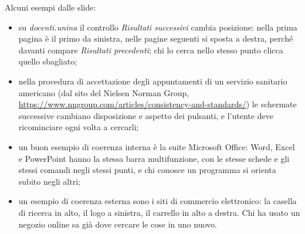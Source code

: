 Alcuni esempi dalle slide:

\begin{itemize}
  \item su \textit{docenti.unina} il controllo \textit{Risultati successivi} cambia posizione: nella prima pagina è il
        primo da sinistra, nelle pagine seguenti si sposta a destra, perché davanti compare \textit{Risultati
        precedenti}; chi lo cerca nello stesso punto clicca quello sbagliato;
\end{itemize}

\begin{center}
\end{center}

\begin{itemize}
  \item nella procedura di accettazione degli appuntamenti di un servizio sanitario americano (dal sito del Nielsen
        Norman Group, \url{https://www.nngroup.com/articles/consistency-and-standards/}) le schermate successive
        cambiano disposizione e aspetto dei pulsanti, e l'utente deve ricominciare ogni volta a cercarli;
  \item un buon esempio di coerenza interna è la suite Microsoft Office: Word, Excel e PowerPoint hanno la stessa barra
        multifunzione, con le stesse schede e gli stessi comandi negli stessi punti, e chi conosce un programma si
        orienta subito negli altri;
  \item un esempio di coerenza esterna sono i siti di commercio elettronico: la casella di ricerca in alto, il logo a
        sinistra, il carrello in alto a destra. Chi ha usato un negozio online sa già dove cercare le cose in uno nuovo.
\end{itemize}

